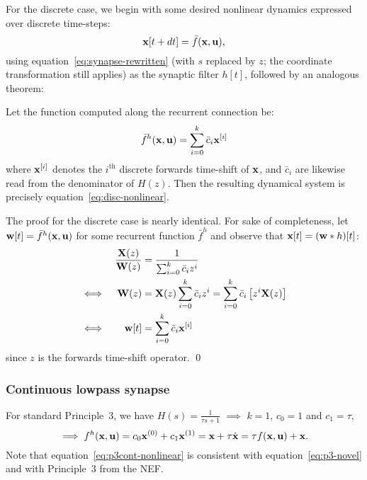 For the discrete case, we begin with some desired nonlinear dynamics expressed over discrete time-steps:
\begin{equation} \label{eq:disc-nonlinear}
\mathbf{x}[t+dt] = \bar{f}(\mathbf{x}, \mathbf{u}) \text{,}
\end{equation}
using equation~\ref{eq:synapse-rewritten} (with $s$ replaced by $z$; the coordinate transformation still applies) as the synaptic filter $h[t]$, followed by an analogous theorem:
\begin{theorem} \label{thm:p3disc-nonlinear}
Let the function computed along the recurrent connection be:
\begin{align}
\bar{f}^h(\mathbf{x}, \mathbf{u}) = \sum_{i=0}^k \bar{c}_i \mathbf{x}^{[i]}
\end{align}
where $\mathbf{x}^{[i]}$ denotes the $i^\text{th}$ discrete forwards time-shift of $\mathbf{x}$, and $\bar{c}_i$ are likewise read from the denominator of $H(z)$.
Then the resulting dynamical system is precisely equation~\ref{eq:disc-nonlinear}.
\end{theorem}
The proof for the discrete case is nearly identical.
For sake of completeness, let $\mathbf{w}[t] = \bar{f}^h(\mathbf{x}, \mathbf{u})$ for some recurrent function $\bar{f}^h$ and observe that $\mathbf{x}[t] = (\mathbf{w} \ast h)[t]$:
\begin{align*}
&& \frac{\mathbf{X}(z)}{\mathbf{W}(z)} &= \frac{1}{\sum_{i=0}^k \bar{c}_i z^i} \\
\iff && \mathbf{W}(z) &= \mathbf{X}(z) \sum_{i=0}^k \bar{c}_i z^i = \sum_{i=0}^k \bar{c}_i \left[ z^i \mathbf{X}(z) \right] \\
\iff && \mathbf{w}[t] &= \sum_{i=0}^k \bar{c}_i \mathbf{x}^{[i]}
\end{align*}
since $z$ is the forwards time-shift operator. \qed

\subsubsection{Continuous lowpass synapse}

For standard Principle~3, we have $H(s) = \frac{1}{\tau s + 1}$ $\implies$ $k = 1$, $c_0 = 1$ and $c_1 = \tau$, 
\begin{equation} \label{eq:p3cont-nonlinear}
\implies f^h(\mathbf{x}, \mathbf{u}) = c_0 \mathbf{x}^{(0)} + c_1 \mathbf{x}^{(1)} = \mathbf{x} + \tau \dot{\mathbf{x}} = \tau f(\mathbf{x}, \mathbf{u}) + \mathbf{x} \text{.}
\end{equation}
Note that equation~\ref{eq:p3cont-nonlinear} is consistent with equation~\ref{eq:p3-novel} and with Principle~3 from the NEF.

